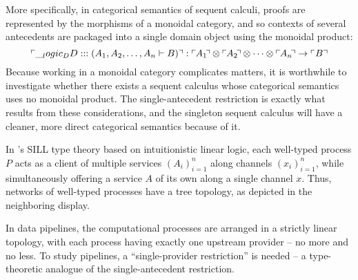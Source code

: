\begin{description}[parsep=0pt, listparindent=\parindent]
  More specifically, in categorical semantics of sequent calculi, proofs are represented by the morphisms of a monoidal category, and so contexts of several antecedents are packaged into a single domain object using the monoidal product:
  \begin{equation*}
    \ulcorner \DD :: (A_1, A_2, \dotsc, A_n \vdash B) \urcorner :
      \ulcorner\mkern-1mu A_1 \mkern-\thinmuskip\urcorner \otimes \ulcorner\mkern-1mu A_2 \mkern-\thinmuskip\urcorner \otimes \dotsb \otimes \ulcorner\mkern-1mu A_n \mkern-\thinmuskip\urcorner \to \ulcorner B \urcorner
  \end{equation*}
  Because working in a monoidal category complicates matters, it is worthwhile to investigate whether there exists a sequent calculus whose categorical semantics uses no monoidal product.
  The single-antecedent restriction is exactly what results from these considerations, and the singleton sequent calculus will have a cleaner, more direct categorical semantics because of it.

\item[Type theory]
  In \citeauthor{Caires+:??}'s SILL type theory\autocite{Caires+:??} based on intuitionistic linear logic, each well-typed process $P$ acts as a client of multiple services $(A_i)_{i=1}^n$ along channels $(x_i)_{i=1}^n$, while simultaneously offering a service $A$ of its own along a single channel $x$.
  Thus, networks of well-typed processes have a tree topology, as depicted in the neighboring display.%

  In data pipelines, the computational processes are arranged in a strictly linear topology, with each process having exactly one upstream provider -- no more and no less.
  To study pipelines, a \enquote{single-provider restriction} is needed -- a type-theoretic analogue of the single-antecedent restriction.
\end{description}



